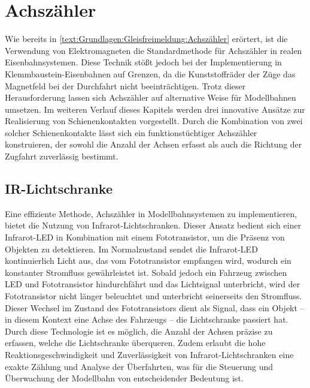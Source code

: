 \section{Achszähler}\label{text:Methodik:Achszähler}

Wie bereits in \autoref{text:Grundlagen:Gleisfreimeldung:Achszähler} erörtert, ist die Verwendung von Elektromagneten die Standardmethode für Achszähler in realen Eisenbahnsystemen. Diese Technik stößt jedoch bei der Implementierung in Klemmbaustein-Eisenbahnen auf Grenzen, da die Kunststoffräder der Züge das Magnetfeld bei der Durchfahrt nicht beeinträchtigen. Trotz dieser Herausforderung lassen sich Achszähler auf alternative Weise für Modellbahnen umsetzen.
\newline
Im weiteren Verlauf dieses Kapitels werden drei innovative Ansätze zur Realisierung von Schienenkontakten vorgestellt. Durch die Kombination von zwei solcher Schienenkontakte lässt sich ein funktionstüchtiger Achszähler konstruieren, der sowohl die Anzahl der Achsen erfasst als auch die Richtung der Zugfahrt zuverlässig bestimmt.

\subsection{IR-Lichtschranke}\label{text:Methodik:Achszähler:Lichtschranke}

Eine effiziente Methode, Achszähler in Modellbahnsystemen zu implementieren, bietet die Nutzung von Infrarot-Lichtschranken. Dieser Ansatz bedient sich einer Infrarot-LED in Kombination mit einem Fototransistor, um die Präsenz von Objekten zu detektieren. Im Normalzustand sendet die Infrarot-LED kontinuierlich Licht aus, das vom Fototransistor empfangen wird, wodurch ein konstanter Stromfluss gewährleistet ist. Sobald jedoch ein Fahrzeug zwischen LED und Fototransistor hindurchfährt und das Lichtsignal unterbricht, wird der Fototransistor nicht länger beleuchtet und unterbricht seinerseits den Stromfluss. Dieser Wechsel im Zustand des Fototransistors dient als Signal, dass ein Objekt – in diesem Kontext eine Achse des Fahrzeugs – die Lichtschranke passiert hat.
\newline
Durch diese Technologie ist es möglich, die Anzahl der Achsen präzise zu erfassen, welche die Lichtschranke überqueren. Zudem erlaubt die hohe Reaktionsgeschwindigkeit und Zuverlässigkeit von Infrarot-Lichtschranken eine exakte Zählung und Analyse der Überfahrten, was für die Steuerung und Überwachung der Modellbahn von entscheidender Bedeutung ist. 

